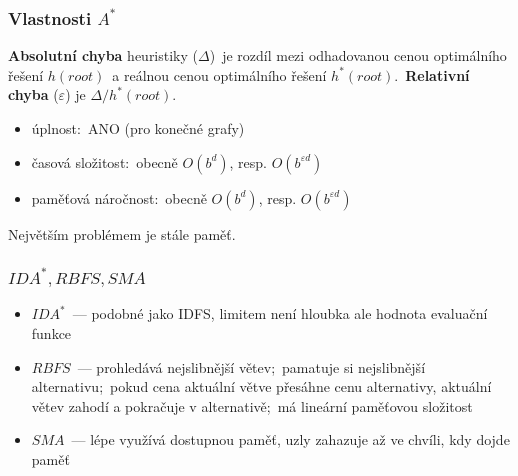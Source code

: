 \documentclass[red,handout,professionalfont]{beamer}
\theoremstyle{definition}
\newcommand{\0}{\mbox{${\bf 0}$}}
\renewcommand{\emph}[1]{{\bf #1}}
\begin{document}
\begin{frame}\frametitle{Vlastnosti $A^*$}
 \emph{Absolutní chyba} heuristiky ($\Delta$)\pause\ je rozdíl mezi odhadovanou cenou optimálního řešení $h(root)$\pause\ a reálnou cenou optimálního řešení $h^*(root)$.\pause\
 \emph{Relativní chyba} ($\varepsilon$) je $\Delta/h^*(root)$.\pause

\begin{itemize}
 \item úplnost:\pause\ ANO (pro konečné grafy)\pause
 \item časová složitost:\pause\ obecně $O(b^d)$\pause, resp. $O(b^{\varepsilon d})$ \pause
 \item paměťová náročnost:\pause\  obecně $O(b^d)$, resp. $O(b^{\varepsilon d})$ \pause
\end{itemize}

Největším problémem je stále \alert{paměť.}
 
\end{frame}

\begin{frame}\frametitle{$IDA^*, RBFS, SMA$}
\begin{itemize}
 \item $IDA^*$\pause\ --- podobné jako IDFS, limitem není hloubka ale hodnota evaluační funkce\pause
 \item $RBFS$\pause\ --- prohledává nejslibnější větev;\pause\ pamatuje si nejslibnější alternativu;\pause\
                         pokud cena aktuální větve přesáhne cenu alternativy\pause, aktuální větev zahodí a pokračuje v alternativě;\pause\
                         má lineární paměťovou složitost\pause
 \item $SMA$\pause\ --- lépe využívá dostupnou paměť\pause, uzly zahazuje až ve chvíli, kdy dojde paměť
\end{itemize}
\end{frame}
\end{document}
